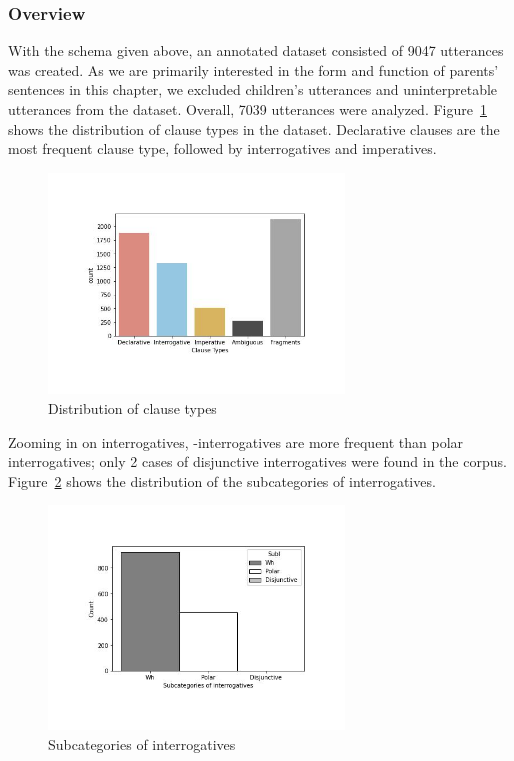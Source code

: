 \subsubsection{Overview}
With the schema given above, an annotated dataset consisted of 9047 utterances was created. As we are primarily interested in the form and function of parents' sentences in this chapter, we excluded children's utterances and uninterpretable utterances from the dataset. Overall, 7039 utterances were analyzed.  Figure~\ref{fig:real-cldist} shows the distribution of clause types in the dataset. Declarative clauses are the most frequent clause type, followed by interrogatives and imperatives. 


\begin{figure}[H]
    \centering
    \includegraphics[width=0.7\textwidth]{figures/real-cldist.jpg}
    \caption{Distribution of clause types}
    \label{fig:real-cldist}
\end{figure}


Zooming in on interrogatives, \twh-interrogatives are more frequent than polar interrogatives; only 2 cases of disjunctive interrogatives were found in the corpus. Figure~\ref{fig:real-subI} shows the distribution of the subcategories of interrogatives. 

\begin{figure}[H]
    \centering
    \includegraphics[width=0.7\textwidth]{figures/real-subI.jpg}
    \caption{Subcategories of interrogatives}
    \label{fig:real-subI}
\end{figure}


